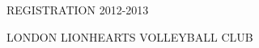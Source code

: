 % 
% 
% 
% 
% 
% 
%
\usepackage{graphicx}
\usepackage{lmodern}
\usepackage{multirow}
\usepackage{wasysym}
\usepackage[cm]{fullpage}
\usepackage[T1]{fontenc}
\setlength{\textheight}{800pt}
\usepackage{ulem}
\usepackage[british]{babel}

\graphicspath{{\datapath/} {\gpath/}}
\def\male{male}
\def\female{female}


\sffamily
\thispagestyle{empty}
\begin{center}


REGISTRATION 2012-2013

LONDON LIONHEARTS VOLLEYBALL CLUB

\end{center}

